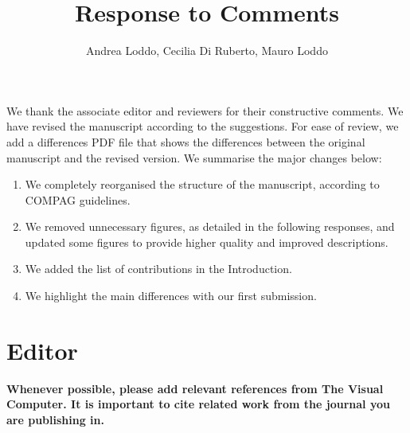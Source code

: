 \documentclass[]{article}
\title{Response to Comments}
\author{Andrea Loddo, Cecilia Di Ruberto, Mauro Loddo}
\begin{document}
	
	\maketitle
	
	We thank the associate editor and reviewers for their constructive comments. 
	We have revised the manuscript according to the suggestions.
	For ease of review, we add a differences PDF file that shows the differences between the original manuscript and the revised version.
	We summarise the major changes below:
	\\
	\begin{enumerate}
		\item We completely reorganised the structure of the manuscript, according to COMPAG guidelines. \\
		\item We removed unnecessary figures, as detailed in the following responses, and updated some figures to provide higher quality and improved descriptions. \\
		\item We added the list of contributions in the Introduction. \\
		\item We highlight the main differences with our first submission.\\
	\end{enumerate}
	
	\section{Editor}
	\textbf{Whenever possible, please add relevant references from The Visual Computer. It is important to cite related work from the journal you are publishing in.} \\
	
	
	

	
\end{document}
